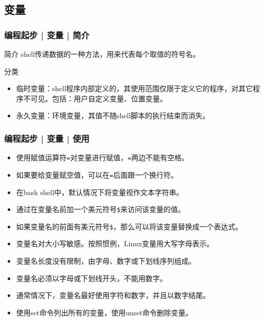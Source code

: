 \subsection{变量}
\begin{frame}
  \frametitle{编程起步 | 变量 | 简介}
  \begin{block}{简介}
    shell传递数据的一种方法，用来代表每个取值的符号名。
  \end{block}
  \pause
  \begin{block}{分类}
    \begin{itemize}
      \item 临时变量：shell程序内部定义的，其使用范围仅限于定义它的程序，对其它程序不可见。包括：用户自定义变量、位置变量。
      \item 永久变量：环境变量，其值不随shell脚本的执行结束而消失。
    \end{itemize}
  \end{block}
\end{frame}

\begin{frame}[fragile]
  \frametitle{编程起步 | 变量 | \alert{使用}}
  \begin{itemize}
    \item 使用赋值运算符\verb|=|对变量进行赋值，\verb|=|两边不能有空格。
    \item 如果要给变量赋空值，可以在\verb|=|后面跟一个换行符。
    \item 在bash shell中，默认情况下将变量视作文本字符串。
    \item 通过在变量名前加一个美元符号\verb|$|来访问该变量的值。
    \item 如果变量名的前面有美元符号\verb|$|，那么可以将该变量替换成一个表达式。
    \item 变量名对大小写敏感。按照惯例，Linux变量用大写字母表示。
    \item 变量名长度没有限制，由字母、数字或下划线序列组成。
    \item 变量名必须以字母或下划线开头，不能用数字。
    \item 通常情况下，变量名最好使用字符和数字，并且以数字结尾。
    \item 使用set命令列出所有的变量，使用unset命令删除变量。
  \end{itemize}
\end{frame}

